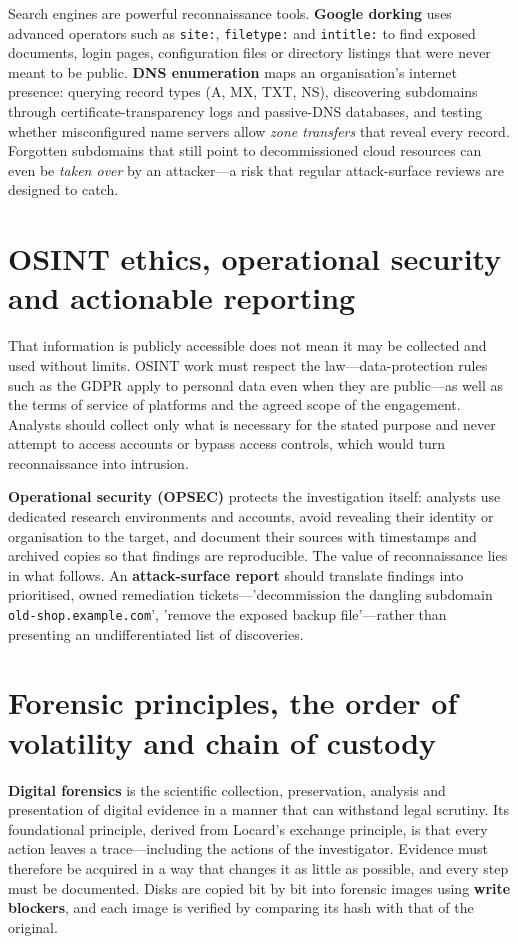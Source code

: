 \documentclass[11pt,openany]{book}
\begin{document}
Search engines are powerful reconnaissance tools. \textbf{Google dorking} uses advanced operators such as \texttt{site:}, \texttt{filetype:} and \texttt{intitle:} to find exposed documents, login pages, configuration files or directory listings that were never meant to be public. \textbf{DNS enumeration} maps an organisation's internet presence: querying record types (A, MX, TXT, NS), discovering subdomains through certificate-transparency logs and passive-DNS databases, and testing whether misconfigured name servers allow \emph{zone transfers} that reveal every record. Forgotten subdomains that still point to decommissioned cloud resources can even be \emph{taken over} by an attacker—a risk that regular attack-surface reviews are designed to catch.

\section{OSINT ethics, operational security and actionable reporting}\label{sec:12.4}
That information is publicly accessible does not mean it may be collected and used without limits. OSINT work must respect the law—data-protection rules such as the GDPR apply to personal data even when they are public—as well as the terms of service of platforms and the agreed scope of the engagement. Analysts should collect only what is necessary for the stated purpose and never attempt to access accounts or bypass access controls, which would turn reconnaissance into intrusion.

\textbf{Operational security (OPSEC)} protects the investigation itself: analysts use dedicated research environments and accounts, avoid revealing their identity or organisation to the target, and document their sources with timestamps and archived copies so that findings are reproducible. The value of reconnaissance lies in what follows. An \textbf{attack-surface report} should translate findings into prioritised, owned remediation tickets—'decommission the dangling subdomain \texttt{old-shop.example.com}', 'remove the exposed backup file'—rather than presenting an undifferentiated list of discoveries.

\section{Forensic principles, the order of volatility and chain of custody}\label{sec:12.5}
\textbf{Digital forensics} is the scientific collection, preservation, analysis and presentation of digital evidence in a manner that can withstand legal scrutiny. Its foundational principle, derived from Locard's exchange principle, is that every action leaves a trace—including the actions of the investigator. Evidence must therefore be acquired in a way that changes it as little as possible, and every step must be documented. Disks are copied bit by bit into forensic images using \textbf{write blockers}, and each image is verified by comparing its hash with that of the original.
\end{document}
